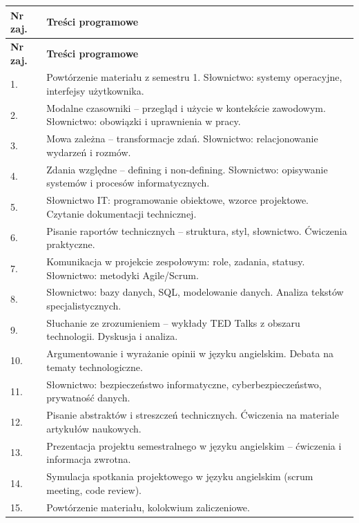 \documentclass[12pt, a4paper]{article}
\newcommand{\thdrule}{\noalign{\global\setlength{\extrarowheight}{0pt}}}
\newcommand{\thdend}{\noalign{\global\setlength{\extrarowheight}{3pt}}}
\begin{document}
{\scriptsize
\begin{longtable}{m{1.5cm}m{14.5cm}}
\thdrule\toprule
\rowcolor{pjatkRed} {\color{white}\textbf{Nr zaj.}} & {\color{white}\textbf{Treści programowe}} \\
\midrule\thdend
\endfirsthead
\thdrule\toprule
\rowcolor{pjatkRed} {\color{white}\textbf{Nr zaj.}} & {\color{white}\textbf{Treści programowe}} \\
\midrule\thdend
\endhead
  \rowcolor{tableRowLight} 1. & Powtórzenie materiału z semestru 1. Słownictwo: systemy operacyjne, interfejsy użytkownika. \\
  \rowcolor{tableRowAlt} 2. & Modalne czasowniki – przegląd i użycie w kontekście zawodowym. Słownictwo: obowiązki i uprawnienia w pracy. \\
  \rowcolor{tableRowLight} 3. & Mowa zależna – transformacje zdań. Słownictwo: relacjonowanie wydarzeń i rozmów. \\
  \rowcolor{tableRowAlt} 4. & Zdania względne – defining i non-defining. Słownictwo: opisywanie systemów i procesów informatycznych. \\
  \rowcolor{tableRowLight} 5. & Słownictwo IT: programowanie obiektowe, wzorce projektowe. Czytanie dokumentacji technicznej. \\
  \rowcolor{tableRowAlt} 6. & Pisanie raportów technicznych – struktura, styl, słownictwo. Ćwiczenia praktyczne. \\
  \rowcolor{tableRowLight} 7. & Komunikacja w projekcie zespołowym: role, zadania, statusy. Słownictwo: metodyki Agile/Scrum. \\
  \rowcolor{tableRowAlt} 8. & Słownictwo: bazy danych, SQL, modelowanie danych. Analiza tekstów specjalistycznych. \\
  \rowcolor{tableRowLight} 9. & Słuchanie ze zrozumieniem – wykłady TED Talks z obszaru technologii. Dyskusja i analiza. \\
  \rowcolor{tableRowAlt} 10. & Argumentowanie i wyrażanie opinii w języku angielskim. Debata na tematy technologiczne. \\
  \rowcolor{tableRowLight} 11. & Słownictwo: bezpieczeństwo informatyczne, cyberbezpieczeństwo, prywatność danych. \\
  \rowcolor{tableRowAlt} 12. & Pisanie abstraktów i streszczeń technicznych. Ćwiczenia na materiale artykułów naukowych. \\
  \rowcolor{tableRowLight} 13. & Prezentacja projektu semestralnego w języku angielskim – ćwiczenia i informacja zwrotna. \\
  \rowcolor{tableRowAlt} 14. & Symulacja spotkania projektowego w języku angielskim (scrum meeting, code review). \\
  \rowcolor{tableRowLight} 15. & Powtórzenie materiału, kolokwium zaliczeniowe. \\
\bottomrule
\end{longtable}}
\end{document}
